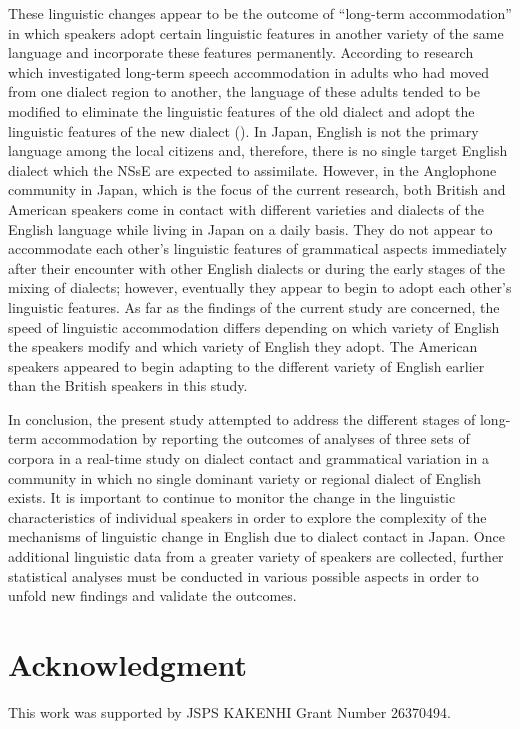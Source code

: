 \documentclass[output=paper,colorlinks,citecolor=brown]{langscibook}
\begin{document}
These linguistic changes appear to be the outcome of “long-term accommodation” \citep[11--21]{Trudgill1986} in which speakers adopt certain linguistic features in another variety of the same language and incorporate these features permanently. According to research which investigated long-term speech accommodation in adults who had moved from one dialect region to another, the language of these adults tended to be modified to eliminate the linguistic features of the old dialect and adopt the linguistic features of the new dialect (\citealt{EvansIverson2007, Kerswill1993, Nycz2011, Omdal1994, Shockey1984, Stanford2008}). In Japan, English is not the primary language among the local citizens and, therefore, there is no single target English dialect which the NSsE are expected to assimilate. However, in the Anglophone community in Japan, which is the focus of the current research, both British and American speakers come in contact with different varieties and dialects of the English language while living in Japan on a daily basis. They do not appear to accommodate each other’s linguistic features of grammatical aspects immediately after their encounter with other English dialects or during the early stages of the mixing of dialects; however, eventually they appear to begin to adopt each other’s linguistic features. As far as the findings of the current study are concerned, the speed of linguistic accommodation differs depending on which variety of English the speakers modify and which variety of English they adopt. The American speakers appeared to begin adapting to the different variety of English earlier than the British speakers in this study.

In conclusion, the present study attempted to address the different stages of long-term accommodation by reporting the outcomes of analyses of three sets of corpora in a real-time study on dialect contact and grammatical variation in a community in which no single dominant variety or regional dialect of English exists. It is important to continue to monitor the change in the linguistic characteristics of individual speakers in order to explore the complexity of the mechanisms of linguistic change in English due to dialect contact in Japan. Once additional linguistic data from a greater variety of speakers are collected, further statistical analyses must be conducted in various possible aspects in order to unfold new findings and validate the outcomes.

\section*{Acknowledgment}

This work was supported by JSPS KAKENHI Grant Number 26370494.

\printbibliography[heading=subbibliography,notkeyword=this]
\end{document}
